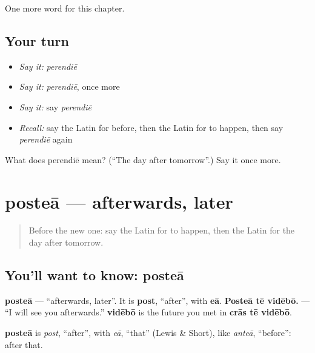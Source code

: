 \begin{grammarlens}[title={What you've built}]
One more word for this chapter.
\end{grammarlens}

\subsection*{Your turn}
\begin{itemize}
\raggedright
  \item \emph{Say it:} \emph{perendiē}
  \item \emph{Say it:} \emph{perendiē}, once more
  \item \emph{Say it:} say \emph{perendiē}
  \item \emph{Recall:} say the Latin for before, then the Latin for to happen, then say \emph{perendiē} again
\end{itemize}

\begin{tcolorbox}[breakable,colback=teal!4,colframe=teal!35!black,title={Before you move on}]
What does perendiē mean? (\textquotedblleft{}The day after tomorrow\textquotedblright{}.) Say it once more.
\end{tcolorbox}
\section[posteā]{posteā — afterwards, later}

\label{lesson:LA-C163-postea}



\begin{quote}
Before the new one: say the Latin for to happen, then the Latin for the day after tomorrow.
\end{quote}

\subsection*{You'll want to know: posteā}
\textbf{posteā} — \textquotedblleft{}afterwards, later\textquotedblright{}. It is \textbf{post}, \textquotedblleft{}after\textquotedblright{}, with \textbf{eā}. \textbf{Posteā tē vidēbō.} — \textquotedblleft{}I will see you afterwards.\textquotedblright{} \textbf{vidēbō} is the future you met in \textbf{crās tē vidēbō}.

\begin{cousinweb}
\textbf{posteā} is \emph{post}, \textquotedblleft{}after\textquotedblright{}, with \emph{eā}, \textquotedblleft{}that\textquotedblright{} (Lewis \& Short), like \emph{anteā}, \textquotedblleft{}before\textquotedblright{}: after that.
\end{cousinweb}


